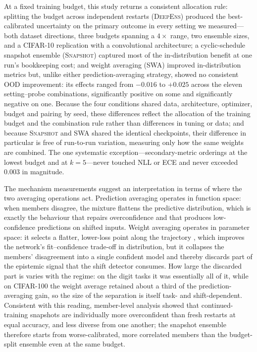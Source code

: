 \documentclass[11pt,a4paper]{article}
\newcommand{\deepens}{\textsc{DeepEns}}
\newcommand{\snapshot}{\textsc{Snapshot}}
\newcommand{\swa}{\textsc{SWA}}
\begin{document}
At a fixed training budget, this study returns a consistent allocation
rule: splitting the budget across independent restarts (\deepens{})
produced the best-calibrated uncertainty on the primary outcome in every
setting we measured---both dataset directions, three budgets spanning a
$4\times$ range, two ensemble sizes, and a CIFAR-10 replication with a
convolutional architecture; a cyclic-schedule snapshot ensemble
(\snapshot{}) captured most of the in-distribution benefit at one run's
bookkeeping cost; and weight averaging (\swa{}) improved in-distribution
metrics but, unlike either prediction-averaging strategy, showed no
consistent OOD improvement: its effects ranged from $-0.016$ to $+0.025$
across the eleven setting--probe combinations, significantly positive on
some and significantly negative on one.
Because the four conditions shared data, architecture, optimizer, budget and
pairing by seed, these differences reflect the allocation of the training
budget and the combination rule rather than differences in tuning or data;
and because \snapshot{} and \swa{} shared the identical checkpoints, their
difference in particular is free of run-to-run variation, measuring only
how the same weights are combined. The one systematic exception---secondary-metric orderings at the
lowest budget and at $k=5$---never touched NLL or ECE and never exceeded
$0.003$ in magnitude.

The mechanism measurements suggest an interpretation in terms of where the
two averaging operations act. Prediction averaging operates in function
space: when members disagree, the mixture flattens the predictive
distribution, which is exactly the behaviour that repairs overconfidence
and that produces low-confidence predictions on shifted inputs. Weight
averaging operates in parameter space: it selects a flatter, lower-loss
point along the trajectory \citep{izmailov2018,wilson2020}, which improves
the network's fit--confidence trade-off in distribution, but it collapses
the members' disagreement into a single confident model and thereby
discards part of the epistemic signal that the shift detector consumes.
How large the discarded part is varies with the regime: on the digit tasks
it was essentially all of it, while on CIFAR-100 the weight average
retained about a third of the prediction-averaging gain, so the size of
the separation is itself task- and shift-dependent. Consistent
with this reading, member-level analysis showed that continued-training
snapshots are individually more overconfident than fresh restarts at equal
accuracy, and less diverse from one another; the snapshot ensemble
therefore starts from worse-calibrated, more correlated members than the
budget-split ensemble even at the same budget.
\end{document}
